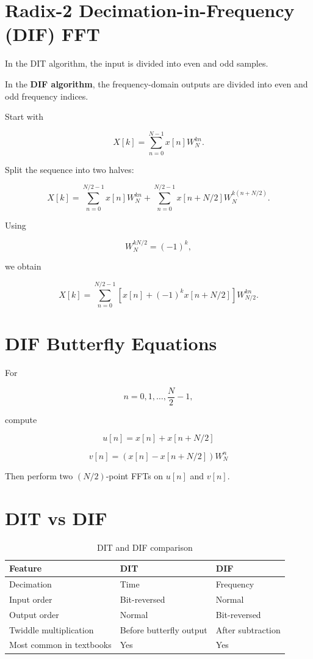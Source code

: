 \section{Radix-2 Decimation-in-Frequency (DIF) FFT}

In the DIT algorithm, the input is divided into even and odd samples.

In the \textbf{DIF algorithm}, the frequency-domain outputs are divided into
even and odd frequency indices.

Start with

\[
X[k]=
\sum_{n=0}^{N-1}x[n]W_N^{kn}.
\]

Split the sequence into two halves:

\[
X[k]=
\sum_{n=0}^{N/2-1}x[n]W_N^{kn}
+
\sum_{n=0}^{N/2-1}x[n+N/2]W_N^{k(n+N/2)}.
\]

Using

\[
W_N^{kN/2}=(-1)^k,
\]

we obtain

\[
X[k]=
\sum_{n=0}^{N/2-1}
\left[
x[n]+(-1)^k x[n+N/2]
\right]
W_{N/2}^{kn}.
\]


\section{DIF Butterfly Equations}

For

\[
n=0,1,\ldots,\frac{N}{2}-1,
\]

compute

\[
\boxed{
u[n]=x[n]+x[n+N/2]
}
\]

\[
\boxed{
v[n]=
\left(x[n]-x[n+N/2]\right)W_N^n
}
\]

Then perform two \((N/2)\)-point FFTs on \(u[n]\) and \(v[n]\).


\section{DIT vs DIF}

\begin{table}[H]
\centering
\caption{DIT and DIF comparison}
\begin{tabular}{|p{4cm}|p{4cm}|p{4cm}|}
\hline
\textbf{Feature} & \textbf{DIT} & \textbf{DIF}\\
\hline
Decimation & Time & Frequency\\
\hline
Input order & Bit-reversed & Normal\\
\hline
Output order & Normal & Bit-reversed\\
\hline
Twiddle multiplication & Before butterfly output & After subtraction\\
\hline
Most common in textbooks & Yes & Yes\\
\hline
\end{tabular}
\end{table}

